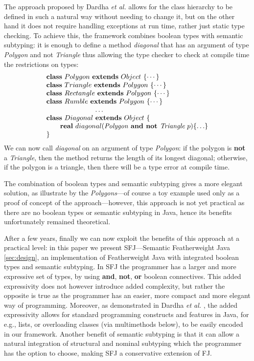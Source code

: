 \documentclass[runningheads]{llncs}
\begin{document}
\begin{example}
The approach proposed by Dardha \emph{et al.} \cite{Dardha2013,Dardha2017} allows for the class hierarchy to be defined in such a natural way without needing to change it, but on the other hand it does not require handling exceptions at run time,  rather just static type checking.
To achieve this, the framework combines boolean types with semantic subtyping: it is enough to define a method \emph{diagonal} that has an argument of type \emph{Polygon} and not \emph{Triangle} thus allowing the type checker to check at compile time the restrictions on types:
$$
\begin{array}{l}
\mathbf{class} \  Polygon \ \mathbf{extends }\  Object\ \{\cdots\}
\\
\mathbf{class} \  Triangle \ \mathbf{extends }\  Polygon\ \{\cdots\}
\\
\mathbf{class} \  Rectangle \ \mathbf{extends }\  Polygon\ \{\cdots\}
\\
\mathbf{class} \  Rumble \ \mathbf{extends }\  Polygon\ \{\cdots\}
\\
\hspace{2.5cm} \ldots
\\
\mathbf{class} \  Diagonal \ \mathbf{extends }\  Object\ \{
	\\
	\qquad \mathbf{real}\ diagonal(\textit{Polygon} \textbf{ and not }  \textit{Triangle} \ p)\{\ldots\}
	\\
\}
\end{array}
$$
We can now call \emph{diagonal} on an argument of type \emph{Polygon}: if the polygon is \textbf{not} a \emph{Triangle}, then the method returns the length of its longest diagonal; otherwise, if the polygon is a triangle, then there will be a type error at compile time.
\end{example}
The combination of boolean types and semantic subtyping gives a more elegant solution, as illustrate by the \emph{Polygons}---of course a toy example used only as a proof of concept of the approach---however, this approach is not yet practical as there are no boolean types or semantic subtyping in Java, hence its benefits unfortunately remained theoretical.

After a few years, finally we can now exploit the benefits of this approach at a practical level: in this paper we present SFJ---Semantic Featherweight Java \autoref{sec:design}, an implementation of Featherweight Java with integrated boolean types and semantic subtyping.
In SFJ the programmer has a larger and more expressive set of types, by using \textbf{and}, \textbf{not}, \textbf{or} boolean connectives. This added expressivity does not however introduce added complexity, but rather the opposite is true as the programmer has an easier, more compact and more elegant way of programming. Moreover, as demonstrated in Dardha \emph{et al.} \cite[\S 8.4]{Dardha2017}, the added expressivity allows for standard programming constructs and features in Java, for e.g., lists, or overloading classes (via multimethods below), to be easily encoded in our framework. Another benefit of semantic subtyping is that it can allow a natural integration of structural and nominal subtyping which the programmer has the option to choose, making SFJ a conservative extension of FJ.
\end{document}
